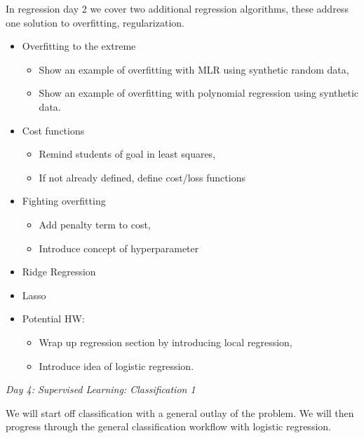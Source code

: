 \documentclass[12pt]{article}
\begin{document}
	\noindent
	In regression day 2 we cover two additional regression algorithms, these address one solution to overfitting, regularization.
	\begin{itemize}
		\item Overfitting to the extreme
			\begin{itemize}
				\item Show an example of overfitting with MLR using synthetic random data,
				\item Show an example of overfitting with polynomial regression using synthetic data.
			\end{itemize}
		\item Cost functions
			\begin{itemize}
				\item Remind students of goal in least squares,
				\item If not already defined, define cost/loss functions
			\end{itemize}
		\item Fighting overfitting
			\begin{itemize}
				\item Add penalty term to cost,
				\item Introduce concept of hyperparameter
			\end{itemize}
		\item Ridge Regression
		\item Lasso
		\item Potential HW:
			\begin{itemize}
				\item Wrap up regression section by introducing local regression,
				\item Introduce idea of logistic regression.
			\end{itemize}
	\end{itemize}
	
	\vspace{2mm}
	\noindent
	\textit{\large{Day 4: Supervised Learning: Classification 1}}
	
	\noindent
	We will start off classification with a general outlay of the problem. We will then progress through the general classification workflow with logistic regression.
	
\end{document}
